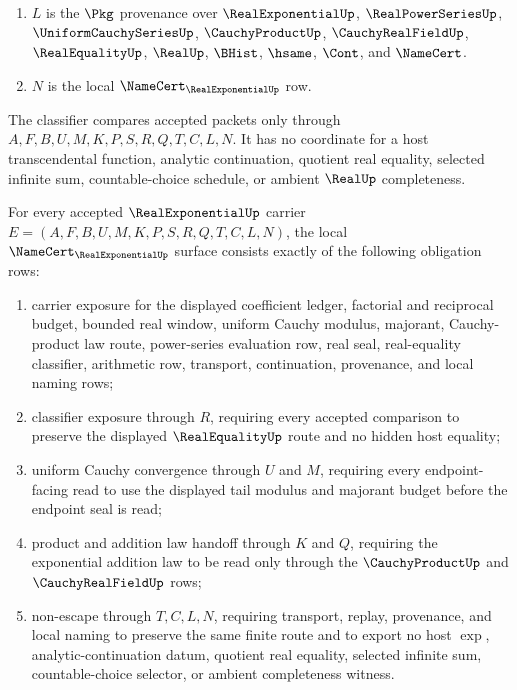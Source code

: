 \begin{definition}
\begin{enumerate}
\item $L$ is the $\Pkg$ provenance over $\RealExponentialUp$, $\RealPowerSeriesUp$, $\UniformCauchySeriesUp$, $\CauchyProductUp$, $\CauchyRealFieldUp$, $\RealEqualityUp$, $\RealUp$, $\BHist$, $\hsame$, $\Cont$, and $\NameCert$.
\item $N$ is the local $\NameCert_{\RealExponentialUp}$ row.
\end{enumerate}
The classifier compares accepted packets only through $A,F,B,U,M,K,P,S,R,Q,T,C,L,N$. It has no coordinate for a host transcendental function, analytic continuation, quotient real equality, selected infinite sum, countable-choice schedule, or ambient $\RealUp$ completeness.
\end{definition}

\begin{theorem}\label{thm:real-exponential-namecert-obligations}
For every accepted $\RealExponentialUp$ carrier $E=(A,F,B,U,M,K,P,S,R,Q,T,C,L,N)$, the local $\NameCert_{\RealExponentialUp}$ surface consists exactly of the following obligation rows:
\begin{enumerate}
\item carrier exposure for the displayed coefficient ledger, factorial and reciprocal budget, bounded real window, uniform Cauchy modulus, majorant, Cauchy-product law route, power-series evaluation row, real seal, real-equality classifier, arithmetic row, transport, continuation, provenance, and local naming rows;
\item classifier exposure through $R$, requiring every accepted comparison to preserve the displayed $\RealEqualityUp$ route and no hidden host equality;
\item uniform Cauchy convergence through $U$ and $M$, requiring every endpoint-facing read to use the displayed tail modulus and majorant budget before the endpoint seal is read;
\item product and addition law handoff through $K$ and $Q$, requiring the exponential addition law to be read only through the $\CauchyProductUp$ and $\CauchyRealFieldUp$ rows;
\item non-escape through $T,C,L,N$, requiring transport, replay, provenance, and local naming to preserve the same finite route and to export no host $\exp$, analytic-continuation datum, quotient real equality, selected infinite sum, countable-choice selector, or ambient completeness witness.
\end{enumerate}
\end{theorem}
